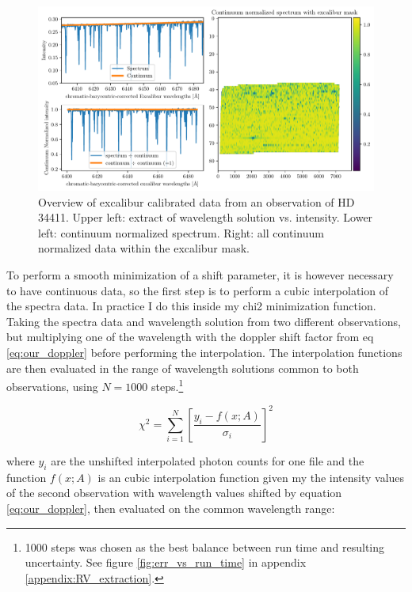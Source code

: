     \begin{figure}%
        \begin{wide}  
            \includegraphics[width=\textwidth]{figures/rv_data_overview.pdf}
            \caption{Overview of excalibur calibrated data from an observation of HD 34411. Upper left: extract of wavelength solution vs. intensity. Lower left: continuum normalized spectrum. Right: all continuum normalized data within the excalibur mask.}
            \label{fig:rv_data_overview}
        \end{wide}
    \end{figure}
            
    To perform a smooth minimization of a shift parameter, it is however necessary to have continuous data, so the first step is to perform a cubic interpolation of the spectra data. In practice I do this inside my chi2 minimization function. Taking the spectra data and wavelength solution from two different observations, but multiplying one of the wavelength with the doppler shift factor from eq \ref{eq:our_doppler} before performing the interpolation. The interpolation functions are then evaluated in the range of wavelength solutions common to both observations, using $N=1000$ steps.\footnote{1000 steps was chosen as the best balance between run time and resulting uncertainty. See figure \ref{fig:err_vs_run_time} in appendix \ref{appendix:RV_extraction}. } 
    
    \begin{equation}
        \label{eq:shift_fit_chi2}
        \chi^{2}=\sum_{i=1}^{N}\left[\frac{y_{i}-f(x; A)}{\sigma_{i}}\right]^{2}
    \end{equation}
    
    where $y_i$ are the unshifted interpolated photon counts for one file and the function $f(x; A)$ is an cubic interpolation function given my the intensity values of the second observation with wavelength values shifted by equation \ref*{eq:our_doppler}, then evaluated on the common wavelength range:
    
